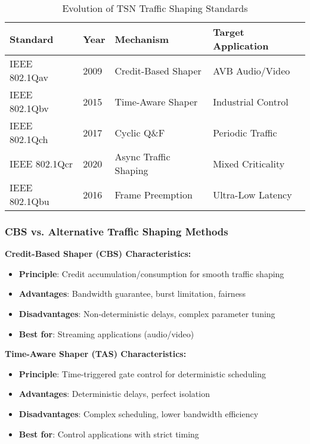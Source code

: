 \documentclass[10pt, journal, compsoc]{IEEEtran}
\begin{document}
\begin{table}[h]
\centering
\caption{Evolution of TSN Traffic Shaping Standards}
\label{tab:tsn_evolution}
\begin{tabular}{llll}
\toprule
\textbf{Standard} & \textbf{Year} & \textbf{Mechanism} & \textbf{Target Application} \\
\midrule
IEEE 802.1Qav & 2009 & Credit-Based Shaper & AVB Audio/Video \\
IEEE 802.1Qbv & 2015 & Time-Aware Shaper & Industrial Control \\
IEEE 802.1Qch & 2017 & Cyclic Q\&F & Periodic Traffic \\
IEEE 802.1Qcr & 2020 & Async Traffic Shaping & Mixed Criticality \\
IEEE 802.1Qbu & 2016 & Frame Preemption & Ultra-Low Latency \\
\bottomrule
\end{tabular}
\end{table}

\subsubsection{CBS vs. Alternative Traffic Shaping Methods}

\textbf{Credit-Based Shaper (CBS) Characteristics:}
\begin{itemize}
    \item \textbf{Principle}: Credit accumulation/consumption for smooth traffic shaping
    \item \textbf{Advantages}: Bandwidth guarantee, burst limitation, fairness
    \item \textbf{Disadvantages}: Non-deterministic delays, complex parameter tuning
    \item \textbf{Best for}: Streaming applications (audio/video)
\end{itemize}

\textbf{Time-Aware Shaper (TAS) Characteristics:}
\begin{itemize}
    \item \textbf{Principle}: Time-triggered gate control for deterministic scheduling
    \item \textbf{Advantages}: Deterministic delays, perfect isolation
    \item \textbf{Disadvantages}: Complex scheduling, lower bandwidth efficiency
    \item \textbf{Best for}: Control applications with strict timing
\end{itemize}
\end{document}
